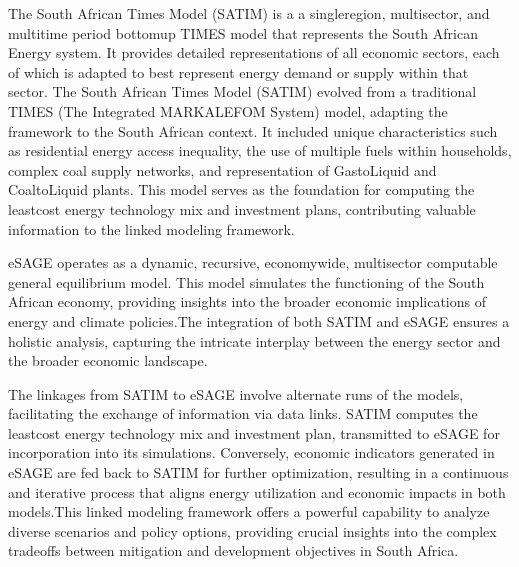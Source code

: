 \documentclass[letterpaper,10pt,english]{jupyterBook}
\begin{document}
\sphinxAtStartPar
The South African Times Model (SATIM) is a a single\sphinxhyphen{}region, multi\sphinxhyphen{}sector, and multi\sphinxhyphen{}time period bottom\sphinxhyphen{}up TIMES model that represents the South African Energy system. It provides detailed representations of all economic sectors, each of which is adapted to best represent energy demand or supply within that sector. The South African Times Model (SATIM) evolved from a traditional TIMES (The Integrated MARKAL\sphinxhyphen{}EFOM System) model, adapting the framework to the South African context. It included unique characteristics such as residential energy access inequality, the use of multiple fuels within households, complex coal supply networks, and representation of Gas\sphinxhyphen{}to\sphinxhyphen{}Liquid and Coal\sphinxhyphen{}to\sphinxhyphen{}Liquid plants. This model serves as the foundation for computing the least\sphinxhyphen{}cost energy technology mix and investment plans, contributing valuable information to the linked modeling framework.

\begin{DUlineblock}{0em}
\item[] 
\end{DUlineblock}

\sphinxAtStartPar
eSAGE operates as a dynamic, recursive, economy\sphinxhyphen{}wide, multi\sphinxhyphen{}sector computable general equilibrium model. This model simulates the functioning of the South African economy, providing insights into the broader economic implications of energy and climate policies.The integration of both SATIM and eSAGE ensures a holistic analysis, capturing the intricate interplay between the energy sector and the broader economic landscape.

\begin{DUlineblock}{0em}
\item[] 
\end{DUlineblock}

\sphinxAtStartPar
The linkages from SATIM to eSAGE involve alternate runs of the models, facilitating the exchange of information via data links. SATIM computes the least\sphinxhyphen{}cost energy technology mix and investment plan, transmitted to eSAGE for incorporation into its simulations. Conversely, economic indicators generated in eSAGE are fed back to SATIM for further optimization, resulting in a continuous and iterative process that aligns energy utilization and economic impacts in both models.This linked modeling framework offers a powerful capability to analyze diverse scenarios and policy options, providing crucial insights into the complex trade\sphinxhyphen{}offs between mitigation and development objectives in South Africa.
\end{document}
